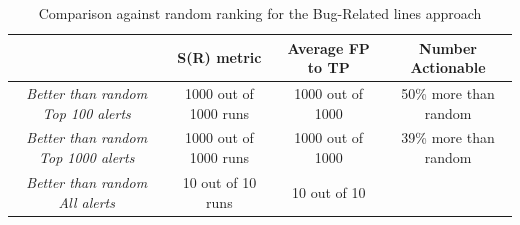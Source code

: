 \begin{table}[H]
	\caption{Comparison against random ranking for the Bug-Related lines approach}
	\label{results:ranking_brls}
	\centering
	\begin{tabular}{@{}cccc@{}}
		\toprule
		& \textbf{S(R) metric}  & \textbf{Average FP to TP} & \textbf{Number Actionable} \\ \midrule
		\textit{Better than random Top 100 alerts}  & 1000 out of 1000 runs & 1000 out of 1000          & 50\% more than random      \\
		\textit{Better than random Top 1000 alerts} & 1000 out of 1000 runs & 1000 out of 1000          & 39\% more than random      \\
		\textit{Better than random All alerts}      & 10 out of 10 runs     & 10 out of 10              &                            \\ \bottomrule
	\end{tabular}
\end{table}

